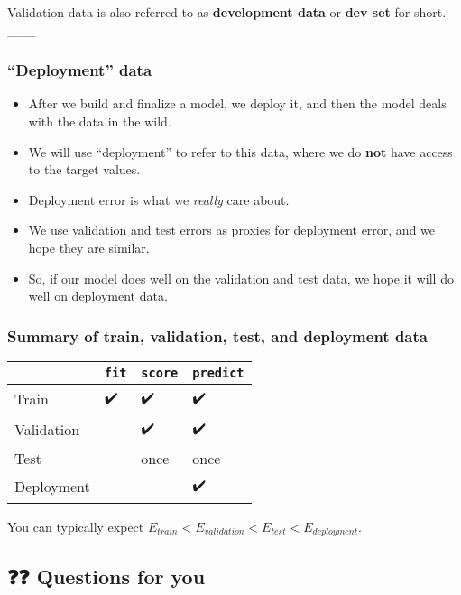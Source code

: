 \documentclass[11pt]{article}
\providecommand{\tightlist}{%
      \setlength{\itemsep}{0pt}\setlength{\parskip}{0pt}}
\begin{document}
Validation data is also referred to as \textbf{development data} or
\textbf{dev set} for short.\\
\_\_\_

    \subsubsection{``Deployment'' data}\label{deployment-data}

\begin{itemize}
\tightlist
\item
  After we build and finalize a model, we deploy it, and then the model
  deals with the data in the wild.
\item
  We will use ``deployment'' to refer to this data, where we do
  \textbf{not} have access to the target values.
\item
  Deployment error is what we \emph{really} care about.
\item
  We use validation and test errors as proxies for deployment error, and
  we hope they are similar.
\item
  So, if our model does well on the validation and test data, we hope it
  will do well on deployment data.
\end{itemize}

    \subsubsection{Summary of train, validation, test, and deployment
data}\label{summary-of-train-validation-test-and-deployment-data}

\begin{longtable}[]{@{}llll@{}}
\toprule\noalign{}
& \texttt{fit} & \texttt{score} & \texttt{predict} \\
\midrule\noalign{}
\endhead
\bottomrule\noalign{}
\endlastfoot
Train & ✔️ & ✔️ & ✔️ \\
Validation & & ✔️ & ✔️ \\
Test & & once & once \\
Deployment & & & ✔️ \\
\end{longtable}

You can typically expect
\(E_{train} < E_{validation} < E_{test} < E_{deployment}\).

    \subsection{❓❓ Questions for you}\label{questions-for-you}
\end{document}
